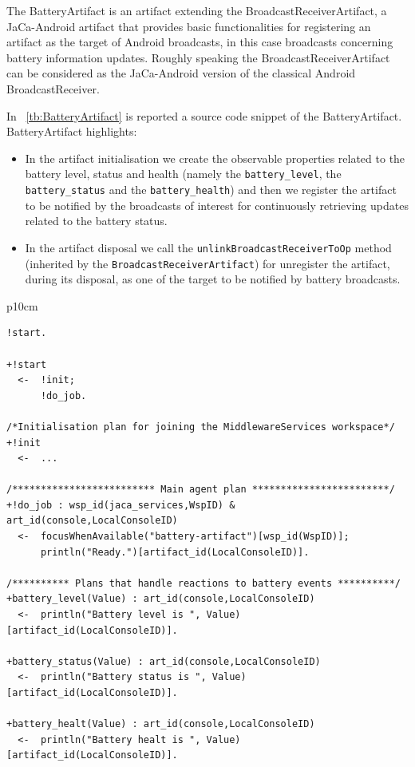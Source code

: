 \documentclass[11pt]{report}
\newcommand\labeltab[1]{\label{tb:#1}}
\newcommand\xt[1]{\tablename~\ref{tb:#1}}
\newcommand\code[1]{{\mbox{\texttt{{#1}}}}}
\newcommand\keyword[1]{{\mbox{\textsf{{#1}}}}}
\newcommand{\jason}{\mbox{\sf{\emph{{Jason}}}}}
\newcommand{\jacandroid}{\textsf{JaCa-Android}}
\begin{document}
The \textsf{BatteryArtifact} is an artifact extending the \keyword{BroadcastReceiverArtifact}, a \textsf{JaCa-Android} artifact that provides basic functionalities for registering an artifact as the target of Android broadcasts, in this case broadcasts concerning battery information updates. Roughly speaking the \keyword{BroadcastReceiverArtifact} can be considered as the \jacandroid{} version of the classical Android \keyword{BroadcastReceiver}.


In \xt{BatteryArtifact} is reported a source code snippet of the \textsf{BatteryArtifact}.
%
\textsf{BatteryArtifact} highlights:
\begin{itemize}
%
\item In the artifact initialisation we create the observable properties related to the battery level, status and health (namely the \code{battery\_level}, the \code{battery\_status} and the \code{battery\_health}) and then we register the artifact to be notified by the broadcasts of interest for continuously retrieving updates related to the battery status.
%
\item In the artifact disposal we call the \code{unlinkBroadcastReceiverToOp} method (inherited by the \code{BroadcastReceiverArtifact}) for unregister the artifact, during its disposal, as one of the target to be notified by battery broadcasts.
\end{itemize}

\begin{table}[!ht]
\begin{tabular} {p{10cm}}
\begin{minipage}{10cm}
{\scriptsize \begin{verbatim}
!start.

+!start
  <-  !init;
      !do_job.

/*Initialisation plan for joining the MiddlewareServices workspace*/
+!init 
  <-  ...
		
/************************* Main agent plan ************************/		
+!do_job : wsp_id(jaca_services,WspID) & art_id(console,LocalConsoleID)
  <-  focusWhenAvailable("battery-artifact")[wsp_id(WspID)];
      println("Ready.")[artifact_id(LocalConsoleID)].

/********** Plans that handle reactions to battery events **********/
+battery_level(Value) : art_id(console,LocalConsoleID)
  <-  println("Battery level is ", Value)[artifact_id(LocalConsoleID)].

+battery_status(Value) : art_id(console,LocalConsoleID)
  <-  println("Battery status is ", Value)[artifact_id(LocalConsoleID)].

+battery_healt(Value) : art_id(console,LocalConsoleID)
  <-  println("Battery healt is ", Value)[artifact_id(LocalConsoleID)].
	
\end{verbatim}}
\end{minipage}
\end{tabular}
\caption{Source code snippet of the \jason{} agent used in this test.}
    \labeltab{test3agent}
\end{table}
\end{document}
